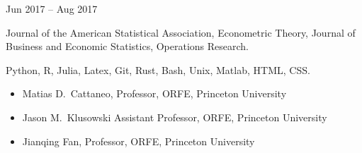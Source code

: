 \documentclass[
  date,
  number,
]{wgu-cv}
\begin{document}
{}
{Jun 2017 -- Aug 2017}


Journal of the American Statistical Association,
Econometric Theory,
Journal of Business and Economic Statistics,
Operations Research.


Python,
R,
Julia,
Latex,
Git,
Rust,
Bash,
Unix,
Matlab,
HTML,
CSS.


\vspace*{-2mm}

\begin{itemize}

  \item
    Matias D.\ Cattaneo,
    Professor,
    ORFE,
    Princeton University

  \item
    Jason M.\ Klusowski
    Assistant Professor,
    ORFE,
    Princeton University

  \item
    Jianqing Fan,
    Professor,
    ORFE,
    Princeton University

\end{itemize}

\end{document}
